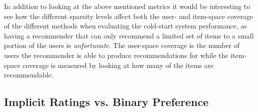 

In addition to looking at the above mentioned metrics it would be interesting to see how
the different sparsity levels affect both the user- and item-space coverage of the different
methods when evaluating the cold-start system performance, as having a recommender that can only
recommend a limited set of items to a small portion of the users is \emph{unfortunate}. The
user-space coverage is the number of users the recommender is able to produce recommendations for while the item-space
coverage is measured by looking at how many of the items are recommendable.

\subsection{Implicit Ratings vs. Binary Preference}

